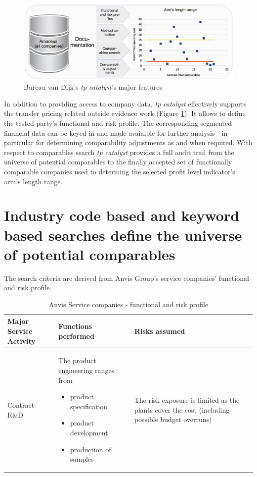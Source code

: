 \documentclass[12pt]{article}
\begin{document}
\begin{figure}[!hbtp]
\includegraphics[width=1.0\textwidth]{./tpCatalyst.eps}
\caption{\footnotesize Bureau van Dijk's \emph{tp catalyst}'s major features}
\label{tpCatalyst}
\end{figure}
In addition to providing access to company data, \emph{tp catalyst} effectively supports the transfer pricing related outside evidence work (Figure \ref{tpCatalyst}). It allows to define the tested party's functional and risk profile. The corresponding segmented financial data can be keyed in and made avaialble for further analysis - in particular for determining comparability adjustments as and when required. With respect to comparables search \emph{tp catalyst} provides a full audit trail from the universe of potential comparables to the finally accepted set of functionally comparable companies used to determing the selected profit level indicator's arm's length range.
\section{Industry code based and keyword based searches define the universe of potential comparables}
The search criteria are derived from Anvis Group's service companies' functional and risk profile.
\begin{table}[!hbtp]
\begin{tabularx}{1.0\textwidth}{|l|X|X|c}
\hline \textbf{Major Service Activity} &  \textbf{Functions performed} & \textbf {Risks assumed}\\
\hline
\small Contract R\&D & \small The product engineering ranges from\begin{itemize} \item \small product specification \item \small product development \item \small production of samples \end{itemize} & \small The risk exposure is limited as the plants cover the cost (including possible budget overruns)\\
\hline
\end{tabularx}
\caption{\footnotesize Anvis Service companies - functional and risk profile}
\label{FunProf}
\end{table}
\end{document}
